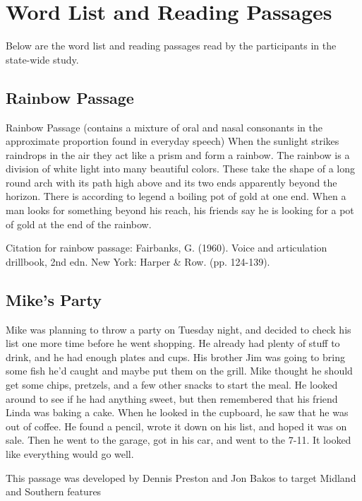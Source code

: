\chapter{Word List and Reading Passages}

Below are the word list and reading passages read by the participants in the state-wide study.

\section{Rainbow Passage}

Rainbow Passage (contains a mixture of oral and nasal consonants in the approximate proportion found in everyday speech)
When the sunlight strikes raindrops in the air they act like a prism and form a rainbow. The rainbow is a division of white light into many beautiful colors. These take the shape of a long round arch with its path high above and its two ends apparently beyond the horizon. There is according to legend a boiling pot of gold at one end. When a man looks for something beyond his reach, his friends say he is looking for a pot of gold at the end of the rainbow. 
\vspace{11pt}

\noindent Citation for rainbow passage: Fairbanks, G. (1960). Voice and articulation drillbook, 2nd edn. New York: Harper \& Row. (pp. 124-139).


\section{Mike's Party}

Mike was planning to throw a party on Tuesday night, and decided to check his list one more time before he went shopping. He already had plenty of stuff to drink, and he had enough plates and cups. His brother Jim was going to bring some fish he'd caught and maybe put them on the grill. Mike thought he should get some chips, pretzels, and a few other snacks to start the meal. He looked around to see if he had anything sweet, but then remembered that his friend Linda was baking a cake. When he looked in the cupboard, he saw that he was out of coffee. He found a pencil, wrote it down on his list, and hoped it was on sale. Then he went to the garage, got in his car, and went to the 7-11. It looked like everything would go well.
\vspace{11pt}

\noindent This passage was developed by Dennis Preston and Jon Bakos to target Midland and Southern features


